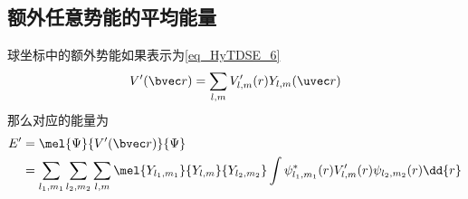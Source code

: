 \subsection{额外任意势能的平均能量}
球坐标中的额外势能如果表示为\autoref{eq_HyTDSE_6}~
\begin{equation}
V'(\bvec r) = \sum_{l,m} V'_{l,m}(r) Y_{l,m}(\uvec r)
\end{equation}
那么对应的能量为
\begin{equation}\label{eq_Hanaly_3}
\begin{aligned}
E' &= \mel{\Psi}{V'(\bvec r)}{\Psi}\\
&= \sum_{l_1,m_1}\sum_{l_2,m_2}\sum_{l,m} \mel{Y_{l_1,m_1}}{Y_{l,m}}{Y_{l_2,m_2}} \int \psi_{l_1,m_1}^*(r) V'_{l,m}(r) \psi_{l_2,m_2}(r) \dd{r}
\end{aligned}
\end{equation}
